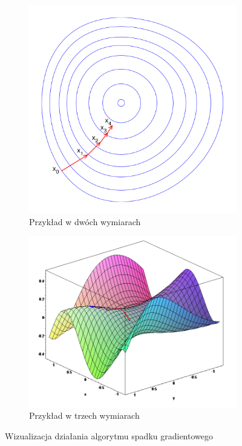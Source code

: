\documentclass{article}
\begin{document}
\begin{figure}[H]
    \centering
    \begin{subfigure}{0.75\linewidth}
        \includegraphics[width=\linewidth]{images/gradient_2d.png}
        \caption{Przykład w dwóch wymiarach\cite{gradient2d}}
    \end{subfigure}
    \begin{subfigure}{0.75\linewidth}
        \includegraphics[width=\linewidth]{images/gradient_3d.png}
        \caption{Przykład w trzech wymiarach\cite{gradient3d}}
    \end{subfigure}
    \caption{Wizualizacja działania algorytmu spadku gradientowego}
\end{figure}
\end{document}
